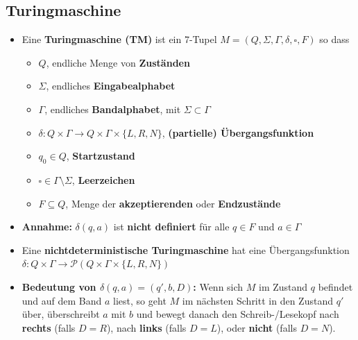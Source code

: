 \documentclass[ieeetran]{article}
\begin{document}
\subsection{Turingmaschine} %
\label{sub:turingmaschine}
\begin{itemize}
  \item Eine \textbf{Turingmaschine (TM)} ist ein 7-Tupel $M = (Q,\Sigma, \Gamma, \delta, \square, F)$ so dass
	 \begin{itemize}
	   \item $Q$, endliche Menge von \textbf{Zuständen}
	\item $\Sigma$, endliches \textbf{Eingabealphabet}
	\item $\Gamma$, endliches \textbf{Bandalphabet}, mit $\Sigma \subset \Gamma$
	\item $\delta: Q \times \Gamma \rightarrow Q \times \Gamma \times \{L,R,N\}$, \textbf{(partielle) Übergangsfunktion} 
		
	\item $q_0 \in Q$, \textbf{Startzustand}
	\item $\square \in \Gamma \setminus \Sigma$, \textbf{Leerzeichen}
		\item $F \subseteq Q$, Menge der \textbf{akzeptierenden} oder \textbf{Endzustände}

	 \end{itemize}
	 \item \textbf{Annahme:} $\delta(q,a)$ ist \textbf{nicht definiert} für alle $q \in F$ und $a \in \Gamma$
	 \item Eine \textbf{nichtdeterministische Turingmaschine} hat eine Übergangsfunktion $\delta: Q \times \Gamma \rightarrow \mathcal{P}(Q \times \Gamma \times \{L,R,N\})$
		 \item \textbf{Bedeutung von $\delta(q,a) = (q',b,D)$:} Wenn sich $M$ im Zustand $q$ befindet und auf dem Band $a$ liest, so geht $M$ im nächsten Schritt in den Zustand $q'$ über, überschreibt $a$ mit $b$ und bewegt danach den Schreib-/Lesekopf nach \textbf{rechts} (falls $D =R$), nach \textbf{links} (falls $D = L$), oder \textbf{nicht} (falls $D = N$).
\end{itemize}
\end{document}
